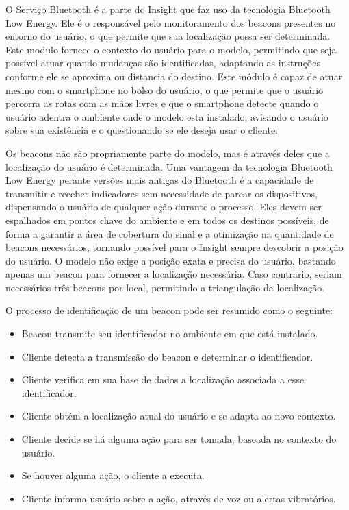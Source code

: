 \documentclass[twoside,english,brazilian]{UNISINOSartigo}
\begin{document}
O Serviço Bluetooth é a parte do Insight que faz uso da tecnologia Bluetooth Low Energy. Ele é o responsável pelo monitoramento dos beacons presentes no entorno do usuário, o que permite que sua localização possa ser determinada. Este modulo fornece o contexto do usuário para o modelo, permitindo que seja possível atuar quando mudanças são identificadas, adaptando as instruções conforme ele se aproxima ou distancia do destino. Este módulo é capaz de atuar mesmo com o smartphone no bolso do usuário, o que permite que o usuário percorra as rotas com as mãos livres e que o smartphone detecte quando o usuário adentra o ambiente onde o modelo esta instalado, avisando o usuário sobre sua existência e o questionando se ele deseja usar o cliente.

Os beacons não são propriamente parte do modelo, mas é através deles que a localização do usuário é determinada. Uma vantagem da tecnologia Bluetooth Low Energy perante versões mais antigas do Bluetooth é a capacidade de transmitir e receber indicadores sem necessidade de parear os dispositivos, dispensando o usuário de qualquer ação durante o processo. Eles devem ser espalhados em pontos chave do ambiente e em todos os destinos possíveis, de forma a garantir a área de cobertura do sinal e a otimização na quantidade de beacons necessários, tornando possível para o Insight sempre descobrir a posição do usuário. O modelo não exige a posição exata e precisa do usuário, bastando apenas um beacon para fornecer a localização necessária. Caso contrario, seriam necessários três beacons por local, permitindo a triangulação da localização.

O processo de identificação de um beacon pode ser resumido como o seguinte:
\begin{itemize}
	\item Beacon transmite seu identificador no ambiente em que está instalado. 
	\item Cliente detecta a transmissão do beacon e determinar o identificador.
	\item Cliente verifica em sua base de dados a localização associada a esse identificador.
	\item Cliente obtém a localização atual do usuário e se adapta ao novo contexto.
	\item Cliente decide se há alguma ação para ser tomada, baseada no contexto do usuário.
	\item Se houver alguma ação, o cliente a executa.
	\item Cliente informa usuário sobre a ação, através de voz ou alertas vibratórios.
\end{itemize}
\end{document}
